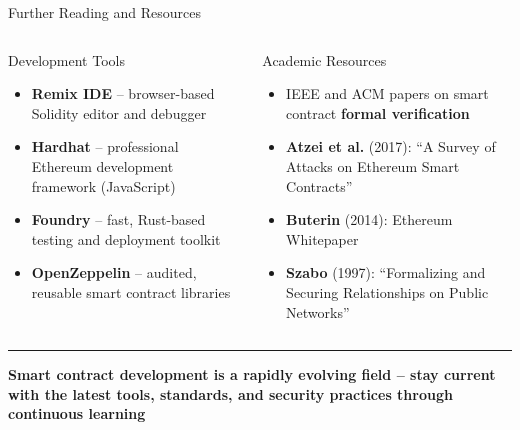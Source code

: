 \documentclass[8pt,aspectratio=169]{beamer}
\newcommand{\bottomnote}[1]{\vfill\vspace{-2mm}\textcolor{mllavender2}{\rule{\textwidth}{0.4pt}}\vspace{1mm}\footnotesize\textbf{#1}}
\begin{document}
\begin{frame}{Further Reading and Resources}
\begin{columns}[T]
\begin{block}{\textcolor{mlorange}{Development Tools}}
\footnotesize
\begin{itemize}
  \item \textbf{Remix IDE} -- browser-based Solidity editor and debugger
  \item \textbf{Hardhat} -- professional Ethereum development framework (JavaScript)
  \item \textbf{Foundry} -- fast, Rust-based testing and deployment toolkit
  \item \textbf{OpenZeppelin} -- audited, reusable smart contract libraries
\end{itemize}
\end{block}
\vspace{2mm}
\begin{block}{\textcolor{mlpurple}{Academic Resources}}
\footnotesize
\begin{itemize}
  \item IEEE and ACM papers on smart contract \textbf{formal verification}
  \item \textbf{Atzei et al.} (2017): ``A Survey of Attacks on Ethereum Smart Contracts''
  \item \textbf{Buterin} (2014): Ethereum Whitepaper
  \item \textbf{Szabo} (1997): ``Formalizing and Securing Relationships on Public Networks''
\end{itemize}
\end{block}
\end{columns}
\bottomnote{Smart contract development is a rapidly evolving field -- stay current with the latest tools, standards, and security practices through continuous learning}
\end{frame}
\end{document}
